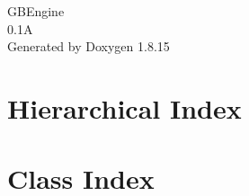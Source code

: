 \let\mypdfximage\pdfximage\def\pdfximage{\immediate\mypdfximage}\documentclass[twoside]{book}
\newcommand{\+}{\discretionary{\mbox{\scriptsize$\hookleftarrow$}}{}{}}
\newcommand{\clearemptydoublepage}{%
  \newpage{\pagestyle{empty}\cleardoublepage}%
}
\begin{document}
\hypersetup{pageanchor=false,
             bookmarksnumbered=true,
             pdfencoding=unicode
            }
\begin{titlepage}
\vspace*{7cm}
\begin{center}%
{\Large G\+B\+Engine \\[1ex]\large 0.\+1A }\\
\vspace*{1cm}
{\large Generated by Doxygen 1.8.15}\\
\end{center}
\end{titlepage}
\clearemptydoublepage
{}
\tableofcontents
\clearemptydoublepage
{}
\hypersetup{pageanchor=true}

\chapter{Hierarchical Index}

\chapter{Class Index}

\end{document}

